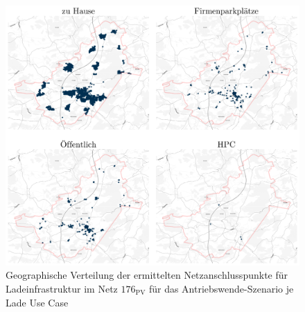 \begin{figure}[H]
    \centering
    \includegraphics[width=\textwidth]{Bilder/cps_in_grid_176}
    \caption[Geographische Verteilung der ermittelten Netzanschlusspunkte für Ladeinfrastruktur im Netz \num{176} für das Antriebswende-Szenario je Lade Use Case]{Geographische Verteilung der ermittelten Netzanschlusspunkte für Ladeinfrastruktur im Netz \(176_{\text{PV}}\) für das Antriebswende-Szenario je Lade Use Case}\label{fig:cps_in_grid}
\end{figure}